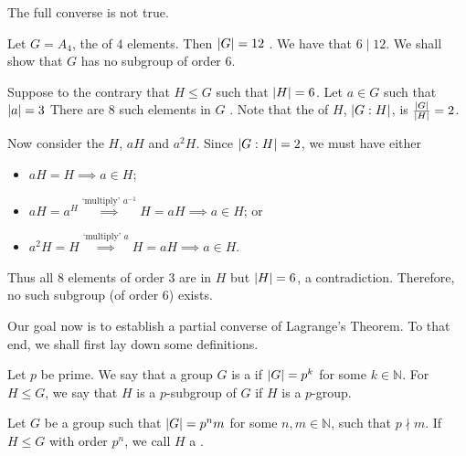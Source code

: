 \documentclass[notoc,notitlepage]{tufte-book}
\begin{document}
The full converse is not true.

\begin{eg}
  Let $G = A_4$, the  of $4$ elements. Then $\left|G\right| = 12$ . We have that $6 \mid 12$. We shall show that $G$ has no subgroup of order $6$.

  Suppose to the contrary that $H \leq G$ such that $\left|H\right| = 6$. Let $a \in G$ such that $\left|a\right| = 3$  There are $8$ such elements in $G$ . Note that the  of $H$, $\left|G : H\right|$, is $\frac{\left|G\right|}{\left|H\right|} = 2$.

  Now consider the  $H$, $aH$ and $a^2 H$. Since $\left|G : H\right| = 2$, we must have either
  \begin{itemize}
    \item $aH = H \implies a \in H$;
    \item $aH = a^H \overset{\text{`multiply' } a^{-1}}{\implies} H = aH \implies a \in H$; or
    \item $a^2H = H \overset{\text{`multiply' } a}{\implies} H = aH \implies a \in H$.
  \end{itemize}
  Thus all $8$ elements of order $3$ are in $H$ but $\left|H\right| = 6$, a contradiction. Therefore, no such subgroup (of order $6$) exists.
\end{eg}

Our goal now is to establish a partial converse of Lagrange's Theorem. To that end, we shall first lay down some definitions.

\begin{defn}[$p$-Group]\label{defn:_p_group}
  Let $p$ be prime. We say that a group $G$ is a  if $\left|G\right| = p^k$ for some $k \in \mathbb{N}$. For $H \leq G$, we say that $H$ is a $p$-subgroup of $G$ if $H$ is a $p$-group.
\end{defn}

\begin{defn}\label{defn:sylow_p_subgroup}
  Let $G$ be a group such that $\left|G\right| = p^n m$ for some $n, m \in \mathbb{N}$, such that $p \nmid m$. If $H \leq G$ with order $p^n$, we call $H$ a .
\end{defn}
\end{document}
